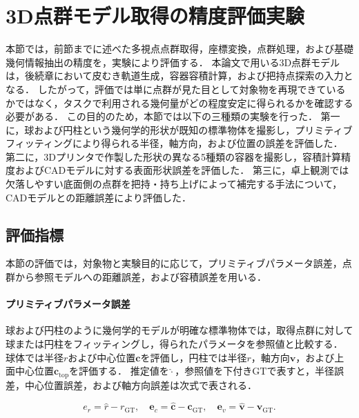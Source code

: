 

\section{3D点群モデル取得の精度評価実験}
\label{sec:system:pointcloud:evaluation}

本節では，前節までに述べた多視点点群取得，座標変換，点群処理，および基礎幾何情報抽出の精度を，実験により評価する．
本論文で用いる3D点群モデルは，後続章において皮むき軌道生成，容器容積計算，および把持点探索の入力となる．
したがって，評価では単に点群が見た目として対象物を再現できているかではなく，タスクで利用される幾何量がどの程度安定に得られるかを確認する必要がある．
この目的のため，本節では以下の三種類の実験を行った．
第一に，球および円柱という幾何学的形状が既知の標準物体を撮影し，プリミティブフィッティングにより得られる半径，軸方向，および位置の誤差を評価した．
第二に，3Dプリンタで作製した形状の異なる5種類の容器を撮影し，容積計算精度およびCADモデルに対する表面形状誤差を評価した．
第三に，卓上観測では欠落しやすい底面側の点群を把持・持ち上げによって補完する手法について，CADモデルとの距離誤差により評価した．

\subsection{評価指標}
\label{sec:system:pointcloud:evaluation:metrics}

本節の評価では，対象物と実験目的に応じて，プリミティブパラメータ誤差，点群から参照モデルへの距離誤差，および容積誤差を用いる．

\paragraph{プリミティブパラメータ誤差}

球および円柱のように幾何学的モデルが明確な標準物体では，取得点群に対して球または円柱をフィッティングし，得られたパラメータを参照値と比較する．
球体では半径$r$および中心位置$\bm{c}$を評価し，円柱では半径$r$，軸方向$\bm{v}$，および上面中心位置$\bm{c}_{\mathrm{top}}$を評価する．
推定値を$\hat{\cdot}$，参照値を下付き$\mathrm{GT}$で表すと，半径誤差，中心位置誤差，および軸方向誤差は次式で表される．

\begin{equation}
  e_r = \hat{r}-r_{\mathrm{GT}}, \quad
  \bm{e}_{c} = \hat{\bm{c}}-\bm{c}_{\mathrm{GT}}, \quad
  \bm{e}_{v} = \hat{\bm{v}}-\bm{v}_{\mathrm{GT}}.
  \label{eq:system:primitive_error}
\end{equation}


